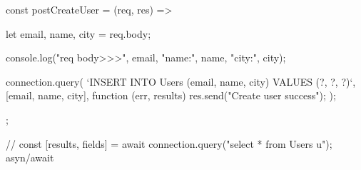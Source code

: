 const postCreateUser = (req, res) => {
  let { email, name, city } = req.body;

  console.log("req body>>>", email, "name:", name, "city:", city);

  connection.query(
    `INSERT INTO Users (email, name, city)
     VALUES (?, ?, ?)`,
    [email, name, city],
    function (err, results) {
      res.send("Create user success");
    }
  );
};

// const [results, fields] = await connection.query("select * from Users u"); asyn/await